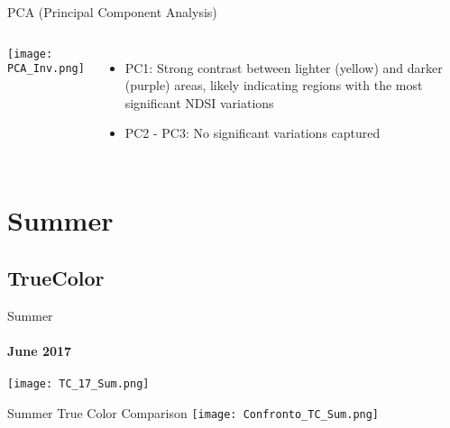 \documentclass[10pt]{beamer}
\begin{document}
\begin{frame}{PCA (Principal Component Analysis)}
    \begin{columns}
            \texttt{[image: PCA\_Inv.png]}

            \begin{itemize}
                \item  PC1: Strong contrast between lighter (yellow) and darker (purple) areas, likely indicating regions with the most significant NDSI variations 
                \item PC2 - PC3: No significant variations captured
            \end{itemize}
    \end{columns}
    
\end{frame}




\section{Summer}
\subsection{TrueColor}
\begin{frame}{Summer}
    \framesubtitle{June 2017}
        \centering
        \texttt{[image: TC\_17\_Sum.png]}
\end{frame}

\begin{frame}{Summer True Color Comparison}
    \centering
    \texttt{[image: Confronto\_TC\_Sum.png]}  
\end{frame}
\end{document}
